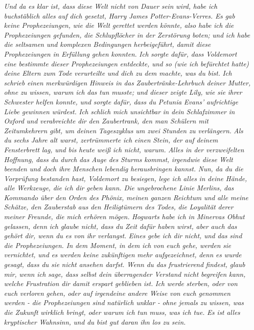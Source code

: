 \emph{Und da es klar ist, dass diese Welt nicht von Dauer sein wird, habe ich
buchstäblich alles auf dich gesetzt, Harry James Potter-Evans-Verres. Es gab
keine Prophezeiungen, wie die Welt gerettet werden könnte, also habe ich die
Prophezeiungen gefunden, die Schlupflöcher in der Zerstörung boten; und ich habe
die seltsamen und komplexen Bedingungen herbeigeführt, damit diese
Prophezeiungen in Erfüllung gehen konnten.} \emph{Ich sorgte dafür, dass
Voldemort eine bestimmte dieser Prophezeiungen entdeckte, und so (wie ich
befürchtet hatte) deine Eltern zum Tode verurteilte und dich zu dem machte, was
du bist.} \emph{Ich schrieb einen merkwürdigen Hinweis in das
Zaubertränke-Lehrbuch deiner Mutter, ohne zu wissen, warum ich das tun musste;
und dieser zeigte Lily, wie sie ihrer Schwester helfen konnte, und sorgte dafür,
dass du Petunia Evans' aufrichtige Liebe gewinnen würdest.} \emph{Ich schlich
mich unsichtbar in dein Schlafzimmer in Oxford und verabreichte dir den
Zaubertrank, den man Schülern mit Zeitumkehrern gibt, um deinen Tageszyklus um
zwei Stunden zu verlängern.} \emph{Als du sechs Jahre alt warst, zertrümmerte
ich einen Stein, der auf deinem Fensterbrett lag, und bis heute weiß ich nicht,
warum.} \emph{Alles in der verzweifelten Hoffnung, dass du durch das Auge des
Sturms kommst, irgendwie diese Welt beenden und doch ihre Menschen lebendig
herausbringen kannst. Nun, da du die Vorprüfung bestanden hast, Voldemort zu
besiegen, lege ich alles in deine Hände, alle Werkzeuge, die ich dir geben kann.
Die ungebrochene Linie Merlins, das Kommando über den Orden des Phönix, meinen
ganzen Reichtum und alle meine Schätze, den Zauberstab aus den Heiligtümern des
Todes, die Loyalität derer meiner Freunde, die mich erhören mögen.} \emph{
Hogwarts habe ich in Minervas Obhut gelassen, denn ich glaube nicht, dass du
Zeit dafür haben wirst, aber auch das gehört dir, wenn du es von ihr verlangst.}
\emph{Eines gebe ich dir nicht, und das sind die Prophezeiungen. In dem Moment,
in dem ich von euch gehe, werden sie vernichtet, und es werden keine zukünftigen
mehr aufgezeichnet, denn es wurde gesagt, dass du sie nicht ansehen darfst. Wenn
du das frustrierend findest, glaub mir, wenn ich sage, dass selbst dein
überragender Verstand nicht begreifen kann, welche Frustration dir damit erspart
geblieben ist.} \emph{ Ich werde sterben, oder von euch verloren gehen, oder auf
irgendeine andere Weise von euch genommen werden - die Prophezeiungen sind
natürlich unklar - ohne jemals zu wissen, was die Zukunft wirklich bringt, oder
warum ich tun muss, was ich tue. Es ist alles kryptischer Wahnsinn, und du bist
gut daran ihn los zu sein.}

